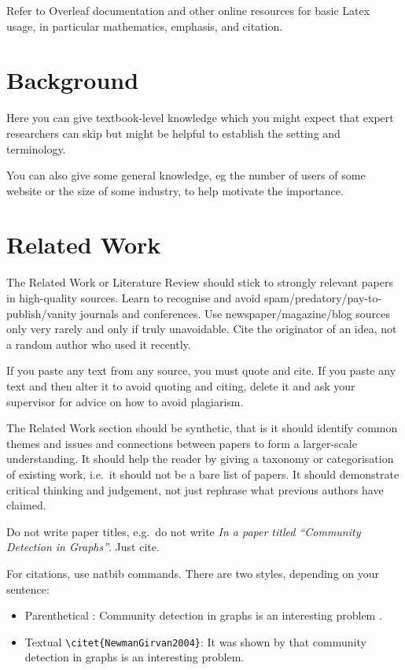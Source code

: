 \documentclass[oneside,12pt]{Classes/RoboticsLaTeX}
\begin{document}
Refer to Overleaf documentation and other online resources for basic Latex usage, in particular mathematics, emphasis, and citation.


\chapter{Background}
\label{chap:backg}

Here you can give textbook-level knowledge which you might expect that expert researchers can skip but might be helpful to establish the setting and terminology. 

You can also give some general knowledge, eg the number of users of some website or the size of some industry, to help motivate the importance.

\chapter{Related Work}
\label{chap:rel_work}

The Related Work or Literature Review should stick to strongly relevant papers in high-quality sources. Learn to recognise and avoid spam/predatory/pay-to-publish/vanity journals and conferences. Use newspaper/magazine/blog sources only very rarely and only if truly unavoidable. Cite the originator of an idea, not a random author who used it recently.

If you paste any text from any source, you must quote and cite. If you paste any text and then alter it to avoid quoting and citing, delete it and ask your supervisor for advice on how to avoid plagiarism.

The Related Work section should be synthetic, that is it should identify common themes and issues and connections between papers to form a larger-scale understanding. It should help the reader by giving a taxonomy or categorisation of existing work, i.e.~it should not be a bare list of papers. It should demonstrate critical thinking and judgement, not just rephrase what previous authors have claimed.

Do not write paper titles, e.g.~do not write {\em In a paper titled ``Community Detection in Graphs''}. Just cite.

For citations, use natbib commands. There are two styles, depending on your sentence:
\begin{itemize}
\item Parenthetical \verb++: Community detection in graphs is an interesting problem .
\item Textual \verb+\citet{NewmanGirvan2004}+: It was shown by  that community detection in graphs is an interesting problem.
\end{itemize}
\end{document}
